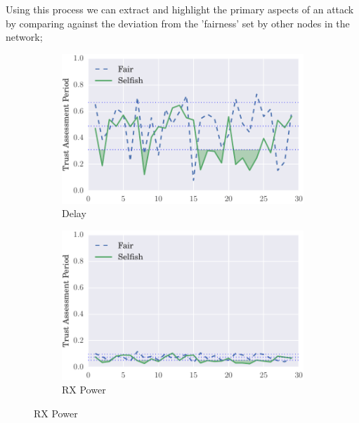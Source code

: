 \documentclass[runningheads,a4paper]{llncs}
\begin{document}
Using this process we can extract and highlight the primary aspects of an attack by comparing against the deviation from the 'fairness' set by other nodes in the network; 

\begin{figure}
\begin{subfigure}{0.32\textwidth}
  \centering
  \includegraphics[width=.95\linewidth]{img/trust_bella_static_emph_ADelay_BadMouthingPowerControl.pdf}
  \caption{Delay}
  \label{fig:static_badmouthing_delay}
\end{subfigure}
\begin{subfigure}{0.32\textwidth}
\centering
  \includegraphics[width=.95\linewidth]{img/trust_bella_static_emph_ARXP_BadMouthingPowerControl.pdf}
  \caption{RX Power}
  \label{fig:static_badmouthing_rxp}

\end{subfigure}
\end{figure}
\end{document}
